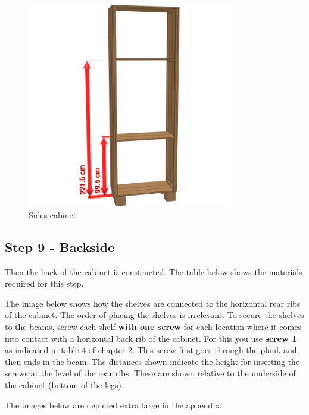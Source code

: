 \documentclass{article}
\begin{document}
\begin{figure}[h!]
    \centering
    \includegraphics[width=0.8\textwidth]{scene 8 - links_rechts.png}
    \caption{Sides cabinet}
    \label{fig:stap 8}
\end{figure}

\clearpage
\newpage

\subsection{Step 9 - Backside}

Then the back of the cabinet is constructed. The table below shows the materials required for this step.



The image below shows how the shelves are connected to the horizontal rear ribs of the cabinet. The order of placing the shelves is irrelevant. To secure the shelves to the beams, screw each shelf \textbf{with one screw} for each location where it comes into contact with a horizontal back rib of the cabinet. For this you use \textbf{screw 1} as indicated in table 4 of chapter 2. This screw first goes through the plank and then ends in the beam. The distances shown indicate the height for inserting the screws at the level of the rear ribs. These are shown relative to the underside of the cabinet (bottom of the legs).

The images below are depicted extra large in the appendix.
\end{document}
